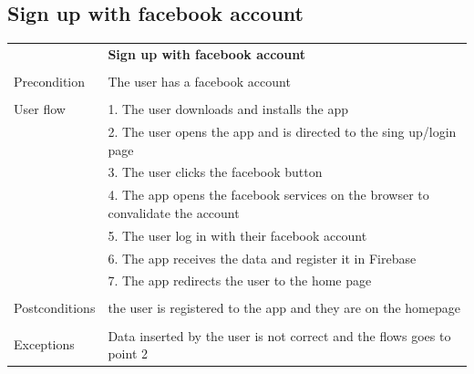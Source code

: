 \documentclass[10pt]{article}
\begin{document}
    \subsection{Sign up with facebook account}
    \begin{tabular}{ p{3cm}|p{8cm} }
     & \textbf{Sign up with facebook account} \\
     \\
     Precondition & The user has a facebook account \\
     \\
     User flow  
     & 1. The user downloads and installs the app\\ 
     & 2. The user opens the app and is directed to the sing up/login page \\
     & 3. The user clicks the facebook button\\ 
     & 4. The app opens the facebook services on the browser to convalidate the account  \\
     & 5. The user log in with their facebook account\\
     & 6. The app receives the data and register it in Firebase\\
     & 7. The app redirects the user to the home page\\
     \\
     Postconditions & the user is registered to the app and they are on the homepage \\ 
     \\
     Exceptions & Data inserted by the user is not correct and the flows goes to point 2\\
    \end{tabular}
    \newline
    \newline
    \newline
\end{document}
